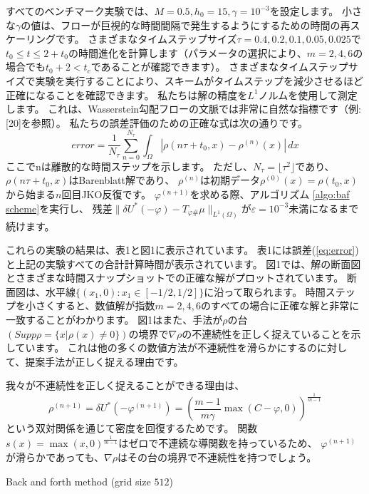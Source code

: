 \documentclass{jsarticle}
\theoremstyle{definition}
\begin{document}
{\color{red}
すべてのベンチマーク実験では、$M = 0.5, h_0 = 15, \gamma = 10^{-3}$を設定します。
}
小さな$\gamma$の値は、フローが巨視的な時間間隔で発生するようにするための時間の再スケーリングです。
さまざまなタイムステップサイズ$\tau = 0.4, 0.2, 0.1, 0.05, 0.025$で$t_0 \le t \le 2 + t_0$の時間進化を計算します（パラメータの選択により、$m = 2, 4, 6$の場合でも$t_0 + 2 < t_c$であることが確認できます）。
さまざまなタイムステップサイズで実験を実行することにより、スキームがタイムステップを減少させるほど正確になることを確認できます。
私たちは解の精度を$L^1$ノルムを使用して測定します。
これは、Wasserstein勾配フローの文脈では非常に自然な指標です（例:[20]を参照）。
私たちの誤差評価のための正確な式は次の通りです。
\begin{equation}
    \label{eq:error}
    error = \frac{1}{N_\tau} \sum_{n = 0}^{N_\tau} \int_\Omega |\rho(n \tau + t_0, x) - \rho^{(n)}(x)|\, dx
\end{equation}
ここでnは離散的な時間ステップを示します。
ただし、$N_\tau = \lfloor \tau^2 \rfloor$であり、$\rho(n\tau + t_0, x)$はBarenblatt解であり、
$\rho^{(n)}$は初期データ$\rho^{(0)}(x) = \rho(t_0, x)$から始まる$n$回目JKO反復です。
$\varphi^{(n+1)}$を求める際、アルゴリズム \ref{algo:baf scheme}を実行し、
残差$\|\delta U^*(- \varphi) - T_{\varphi \#} \mu \|_{L^1(\Omega)}$が$\varepsilon = 10^{-3}$未満になるまで続けます。

これらの実験の結果は、表1と図1に表示されています。
表1には誤差(\ref{eq:error})と上記の実験すべての合計計算時間が表示されています。
図1では、解の断面図とさまざまな時間スナップショットでの正確な解がプロットされています。
断面図は、水平線$\{(x_1, 0) : x_1 \in [-1/2, 1/2]\}$に沿って取られます。
時間ステップを小さくすると、数値解が指数$m = 2, 4, 6$のすべての場合に正確な解と非常に一致することがわかります。
図1はまた、手法が$\rho$の台$(Supp \rho = \{ x | \rho(x) \neq 0\})$の境界で$\nabla\rho$の不連続性を正しく捉えていることを示しています。
これは他の多くの数値方法が不連続性を滑らかにするのに対して、提案手法が正しく捉える理由です。

我々が不連続性を正しく捉えることができる理由は、
\[
    \rho^{(n+1)} = \delta U^*(- \varphi^{(n+1)}) = \left( \frac{m - 1}{m \gamma} \max(C - \varphi, 0)\right)^{\frac{1}{m-1}}
\]
という双対関係を通じて密度を回復するためです。
関数$s(x) = \max(x, 0)^{\frac{1}{m-1}}$はゼロで不連続な導関数を持っているため、
$\varphi^{(n+1)}$が滑らかであっても、$\nabla\rho$はその台の境界で不連続性を持つでしょう。

\begin{table}[hbtp]
    \caption{Back and forth method (grid size $512$)}
    \label{table:baf_test}
    \centering
    
\end{table}
\end{document}
